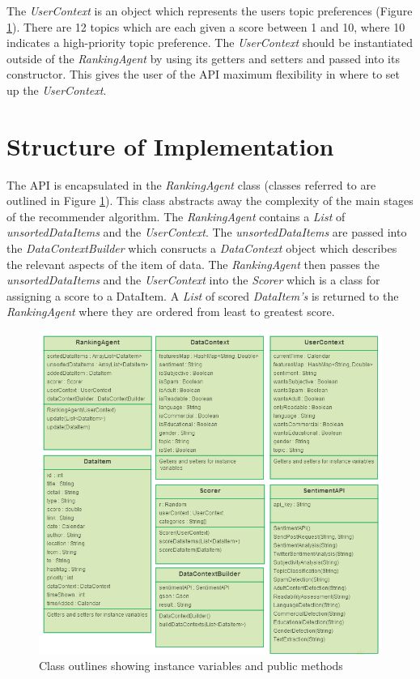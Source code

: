 The \emph{UserContext} is an object which represents the users topic preferences (Figure \ref{classes}). There are 12 topics which are each given a score between 1 and 10, where 10 indicates a high-priority topic preference. The \emph{UserContext} should be instantiated outside of the \emph{RankingAgent} by using its getters and setters and passed into its constructor. This gives the user of the API maximum flexibility in where to set up the \emph{UserContext}. 

\section{Structure of Implementation}

The API is encapsulated in the \emph{RankingAgent} class (classes referred to are outlined in Figure \ref{classes}). This class abstracts away the complexity of the main stages of the recommender algorithm. The \emph{RankingAgent} contains a \emph{List} of \emph{unsortedDataItems} and the \emph{UserContext}. The \emph{unsortedDataItems} are passed into the \emph{DataContextBuilder} which consructs a \emph{DataContext} object which describes the relevant aspects of the item of data. The \emph{RankingAgent} then passes the \emph{unsortedDataItems} and the \emph{UserContext} into the \emph{Scorer} which is a class for assigning a score to a DataItem. A \emph{List} of scored \emph{DataItem's} is returned to the \emph{RankingAgent} where they are ordered from least to greatest score. 

\begin{figure}[ht!]
	\centering
	\includegraphics[width=155mm]{images/ProjectClasses.png}
	\caption{Class outlines showing instance variables and public methods}
	\label{classes}
\end{figure}

